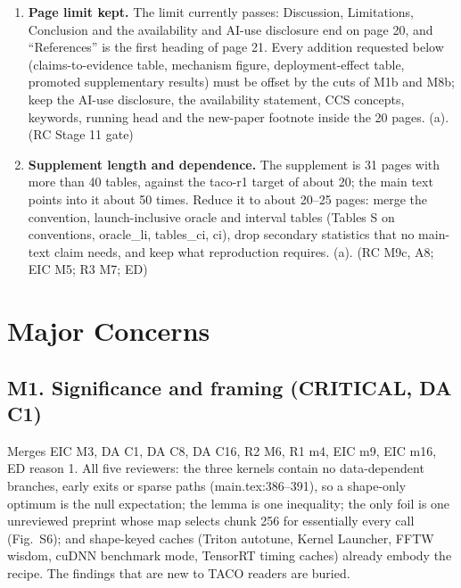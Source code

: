 \documentclass[11pt]{article}
\begin{document}
\begin{enumerate}[label=V\arabic*.]
        so to the editor in the confidential cover letter; confirm that the
        footnote ``New Paper, Not an Extension of a Conference Paper''
        (main.tex:91) remains accurate; and make sure any public code
        repository linked from the preprint does not expose this manuscript or
        its result files during review. (a). (EIC M8; R2 M6 and question 5;
        RC further observations)
  \item \textbf{Page limit kept.} The limit currently passes: Discussion,
        Limitations, Conclusion and the availability and AI-use disclosure end
        on page 20, and ``References'' is the first heading of page 21. Every
        addition requested below (claims-to-evidence table, mechanism figure,
        deployment-effect table, promoted supplementary results) must be
        offset by the cuts of M1b and M8b; keep the AI-use disclosure, the
        availability statement, CCS concepts, keywords, running head and the
        new-paper footnote inside the 20 pages. (a). (RC Stage 11 gate)
  \item \textbf{Supplement length and dependence.} The supplement is 31 pages
        with more than 40 tables, against the taco-r1 target of about 20; the
        main text points into it about 50 times. Reduce it to about 20--25
        pages: merge the convention, launch-inclusive oracle and interval
        tables (Tables S on conventions, oracle\_li, tables\_ci, ci), drop
        secondary statistics that no main-text claim needs, and keep what
        reproduction requires. (a). (RC M9c, A8; EIC M5; R3 M7; ED)
\end{enumerate}

\section*{Major Concerns}

\subsection*{M1. Significance and framing (CRITICAL, DA C1)}
Merges EIC M3, DA C1, DA C8, DA C16, R2 M6, R1 m4, EIC m9, EIC m16, ED reason
1. All five reviewers: the three kernels contain no data-dependent branches,
early exits or sparse paths (main.tex:386--391), so a shape-only optimum is
the null expectation; the lemma is one inequality; the only foil is one
unreviewed preprint whose map selects chunk 256 for essentially every call
(Fig.~S6); and shape-keyed caches (Triton autotune, Kernel Launcher, FFTW
wisdom, cuDNN benchmark mode, TensorRT timing caches) already embody the
recipe. The findings that are new to TACO readers are buried.
\end{document}
